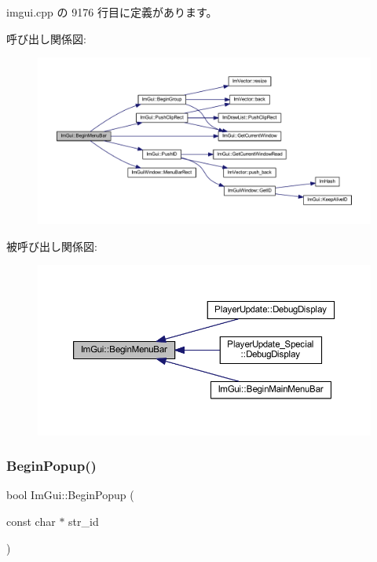  imgui.\+cpp の 9176 行目に定義があります。

呼び出し関係図\+:\nopagebreak
\begin{figure}[H]
\begin{center}
\leavevmode
\includegraphics[width=350pt]{namespace_im_gui_a4852dff802922163fc747e2e0df5b88f_cgraph}
\end{center}
\end{figure}
被呼び出し関係図\+:\nopagebreak
\begin{figure}[H]
\begin{center}
\leavevmode
\includegraphics[width=350pt]{namespace_im_gui_a4852dff802922163fc747e2e0df5b88f_icgraph}
\end{center}
\end{figure}
\mbox{\label{namespace_im_gui_ab71527de4b52ff970e5396040302e134}} 
\subsubsection{\texorpdfstring{Begin\+Popup()}{BeginPopup()}}
{\footnotesize\ttfamily bool Im\+Gui\+::\+Begin\+Popup (\begin{DoxyParamCaption}\item[{const char $\ast$}]{str\+\_\+id }\end{DoxyParamCaption})}



